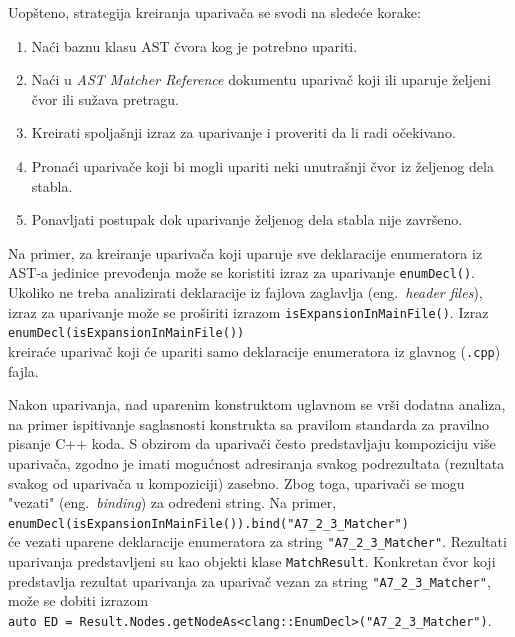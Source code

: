\documentclass[12pt,oneside]{memoir}
\begin{document}
Uopšteno, strategija kreiranja upariva\v{c}a se svodi na sledeće korake:
\begin{enumerate}
\item Na\'{c}i baznu klasu AST \v{c}vora kog je potrebno upariti.
 
\item Na\'{c}i u \textit{AST Matcher Reference} dokumentu \cite{ASTMatcherReference} upariva\v{c} koji ili uparuje \v{z}eljeni čvor ili su\v{z}ava pretragu.
\item Kreirati spoljašnji izraz za uparivanje i proveriti da li radi o\v{c}ekivano.
\item Prona\'{c}i upariva\v{c}e koji bi mogli upariti neki unutrašnji čvor iz željenog dela stabla.
\item Ponavljati postupak dok uparivanje željenog dela stabla nije završeno.
\end{enumerate}

\par
Na primer, za kreiranje upariva\v{c}a koji uparuje sve deklaracije enumeratora iz AST-a jedinice prevođenja mo\v{z}e se koristiti izraz za uparivanje \lstinline[style=customc]{enumDecl()}. Ukoliko ne treba analizirati deklaracije iz fajlova zaglavlja (eng.~\textit{header files}), izraz za uparivanje mo\v{z}e se pro\v{s}iriti izrazom \lstinline[style=customc]{isExpansionInMainFile()}. Izraz \\ \lstinline[style=customc]{enumDecl(isExpansionInMainFile())} \\ kreira\'{c}e upariva\v{c} koji \'{c}e upariti samo deklaracije enumeratora iz glavnog (\texttt{.cpp}) fajla.

Nakon uparivanja, nad uparenim konstruktom uglavnom se vr\v{s}i dodatna analiza, na primer ispitivanje saglasnosti konstrukta sa pravilom standarda za pravilno pisanje C++ koda.
S obzirom da upariva\v{c}i \v{c}esto predstavljaju kompoziciju vi\v{s}e upariva\v{c}a, zgodno je imati mogu\'{c}nost adresiranja svakog podrezultata (rezultata svakog od upariva\v{c}a u kompoziciji) zasebno.
Zbog toga, upariva\v{c}i se mogu "vezati" (eng.~\textit{binding}) za određeni string. Na primer, \\
\lstinline[style=customc]{enumDecl(isExpansionInMainFile()).bind("A7_2_3_Matcher")} \\ će vezati uparene deklaracije enumeratora za string \texttt{"A7\_2\_3\_Matcher"}. Rezultati uparivanja predstavljeni su kao objekti klase \texttt{MatchResult}. Konkretan \v{c}vor koji predstavlja rezultat uparivanja za upariva\v{c} vezan za string \texttt{"A7\_2\_3\_Matcher"},
mo\v{z}e se dobiti izrazom \\ \lstinline[style=customc]{auto ED = Result.Nodes.getNodeAs<clang::EnumDecl>("A7_2_3_Matcher")}.
\end{document}
